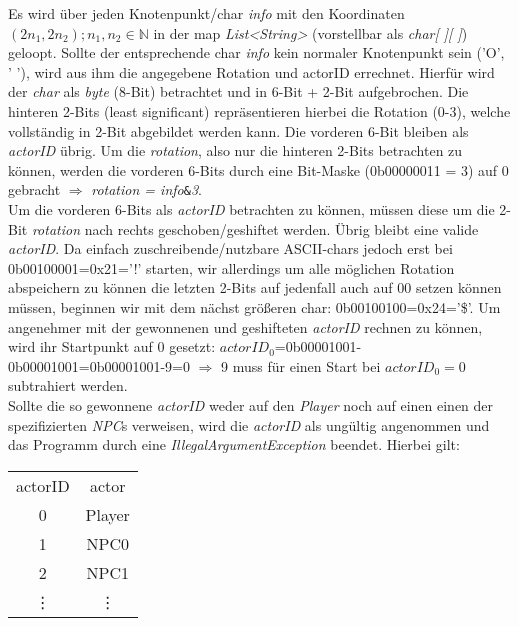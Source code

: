 \documentclass{pi1}
\begin{document}
\newpage

Es wird über jeden Knotenpunkt/char \textit{info} mit den Koordinaten $(2n_1, 2n_2); n_1,n_2\in\mathbb{N}$ in der map \textit{List<String>} (vorstellbar als \textit{char[ ][ ]}) geloopt.
Sollte der entsprechende char \textit{info} kein normaler Knotenpunkt sein ('O', ' '), wird aus ihm die angegebene Rotation und actorID errechnet.
Hierfür wird der \textit{char} als \textit{byte} (8-Bit) betrachtet und in 6-Bit + 2-Bit aufgebrochen. Die hinteren 2-Bits (least significant) repräsentieren hierbei die Rotation (0-3), welche vollständig in 2-Bit abgebildet werden kann.
Die vorderen 6-Bit bleiben als \textit{actorID} übrig. Um die \textit{rotation}, also nur die hinteren 2-Bits betrachten zu können, werden die vorderen 6-Bits durch eine Bit-Maske (0b00000011 = 3) auf 0 gebracht $\Rightarrow$ \textit{rotation = info}\texttt{\&}\textit{3}.\\
Um die vorderen 6-Bits als \textit{actorID} betrachten zu können, müssen diese um die 2-Bit \textit{rotation} nach rechts geschoben/geshiftet werden. Übrig bleibt eine valide \textit{actorID}. Da einfach zuschreibende/nutzbare ASCII-chars jedoch erst bei 0b00100001=0x21='!' starten, wir allerdings um alle möglichen Rotation abspeichern zu können die letzten 2-Bits auf jedenfall auch auf 00 setzen können müssen, beginnen wir mit dem nächst größeren char: 0b00100100=0x24='\$'.
Um angenehmer mit der gewonnenen und geshifteten \textit{actorID} rechnen zu können, wird ihr Startpunkt auf 0 gesetzt: $\textit{actorID}_0$=0b00001001-0b00001001=0b00001001-9=0 $\Rightarrow$ 9 muss für einen Start bei $\textit{actorID}_0=0$ subtrahiert werden.\\


Sollte die so gewonnene \textit{actorID} weder auf den \textit{Player} noch auf einen einen der spezifizierten \textit{NPC}s verweisen, wird die \textit{actorID} als ungültig angenommen und das Programm durch eine \textit{IllegalArgumentException} beendet. Hierbei gilt:\\
\begin{center}
\begin{tabular}{|c|c|}
\cline{0-1}actorID & actor\\\cline{0-1}
0 & Player\\
1 & NPC0\\
2 & NPC1\\
\vdots & \vdots\\\cline{0-1}
\end{tabular}
\end{center}
\end{document}

